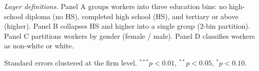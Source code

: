 \begin{table}[H]
\begin{minipage}{\linewidth}
\textit{Layer definitions.} Panel A groups workers into three education bins: no high-school diploma (no HS), completed high school (HS), and tertiary or above (higher). Panel B collapses HS and higher into a single group (2-bin partition). Panel C partitions workers by gender (female / male). Panel D classifies workers as non-white or white.

Standard errors clustered at the firm level. $^{***}p<0.01$, $^{**}p<0.05$, $^{*}p<0.10$.
\end{minipage}
\end{table}